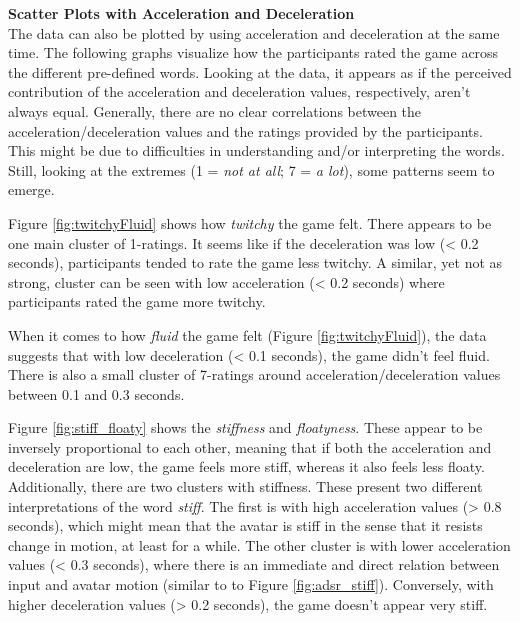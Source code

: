 

\textbf{Scatter Plots with Acceleration and Deceleration}\\
The data can also be plotted by using acceleration and deceleration at the same time. The following graphs visualize how the participants rated the game across the different pre-defined words. Looking at the data, it appears as if the perceived contribution of the acceleration and deceleration values, respectively, aren't always equal. Generally, there are no clear correlations between the acceleration/deceleration values and the ratings provided by the participants. This might be due to difficulties in understanding and/or interpreting the words. Still, looking at the extremes (1 = \textit{not at all}; 7 = \textit{a lot}), some patterns seem to emerge.

Figure \ref{fig:twitchyFluid} shows  how \textit{twitchy} the game felt. There appears to be one main cluster of 1-ratings. It seems like if the deceleration was low (< 0.2 seconds), participants tended to rate the game less twitchy. A similar, yet not as strong, cluster can be seen with low acceleration (< 0.2 seconds) where participants rated the game more twitchy.

When it comes to how \textit{fluid} the game felt (Figure \ref{fig:twitchyFluid}), the data suggests that with low deceleration (< 0.1 seconds), the game didn't feel fluid. There is also a small cluster of 7-ratings around acceleration/deceleration values between 0.1 and 0.3 seconds.

Figure \ref{fig:stiff_floaty} shows the \textit{stiffness} and \textit{floatyness}. These appear to be inversely proportional to each other, meaning that if both the acceleration and deceleration are low, the game feels more stiff, whereas it also feels less floaty. Additionally, there are two clusters with stiffness. These present two different interpretations of the word \textit{stiff}. The first is with high acceleration values (> 0.8 seconds), which might mean that the avatar is stiff in the sense that it resists change in motion, at least for a while. The other cluster is with lower acceleration values (< 0.3 seconds), where there is an immediate and direct relation between input and avatar motion (similar to to Figure \ref{fig:adsr_stiff}). Conversely, with higher deceleration values (> 0.2 seconds), the game doesn't appear very stiff.

